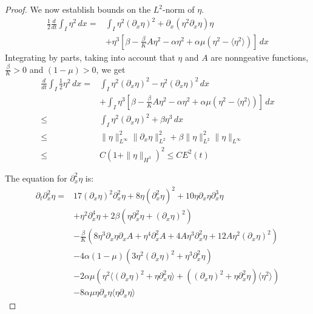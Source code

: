 \documentclass[12pt]{amsart}
\newcommand{\D}{\,d}
\begin{document}
\begin{proof}
We now establish bounds on the $L^2$\nobreakdash-norm of $\eta$.
	\begin{equation*}
        \begin{split}
		\frac{1}{2}\frac{d}{dt} \int_I \eta^2 \D x=&\int_I \eta^2(\partial_x \eta)^2+\partial_x(\eta^2\partial_x\eta)\eta\\
		&+\eta^3\left[\beta-\frac{\beta}{K}A\eta^2-\alpha \eta^2+\alpha\mu(\eta^2-\langle\eta^2\rangle)\right]\D x
        \end{split}
	\end{equation*}
	Integrating by parts, taking into account that $\eta$ and $A$ are nonngeative functions, $\frac{\beta}{K}>0$ and $(1-\mu)>0$, we get
	\begin{align*}
		\frac{d}{dt} \int_I \frac{1}{2}\eta^2 \D x=&\int_I \eta^2(\partial_x \eta)^2-\eta^2(\partial_x\eta)^2
		\D x\\
        &+\int_I \eta^3\left[\beta-\frac{\beta}{K}A\eta^2-\alpha \eta^2+\alpha\mu(\eta^2-\langle \eta^2 \rangle)\right]\D x\\
		\leq&\int_I \eta^2(\partial_x \eta)^2+\beta\eta^3 \D x\\
		\leq& \|\eta\|_{L^\infty}^2\|\partial_x \eta\|_{L^2}^2+\beta\|\eta\|^2_{L^2}\|\eta\|_{L^\infty}\\
		\leq& C(1+\|\eta\|_{H^3})^2	\leq CE^2(t)
	\end{align*}
	
		The equation for $\partial_x^2 \eta$ is:
	\begin{align*}
		\partial_t \partial^2_x\eta=&17(\partial_x \eta)^2\partial_x^2\eta+8\eta(\partial_x^2\eta)^2+10\eta\partial_x\eta\partial_x^3\eta\\
        &+\eta^2\partial_x^4\eta
		+2\beta(\eta\partial^2_x\eta+(\partial_x\eta)^2)\\
		&-\frac{\beta}{K}(8\eta^3\partial_x\eta\partial_xA+\eta^4\partial^2_xA+4A\eta^3\partial^2_x\eta+12A\eta^2(\partial_x\eta)^2)\\
		&-4\alpha(1-\mu)(3\eta^2(\partial_x\eta)^2+\eta^3\partial^2_x\eta)\\
		&-2\alpha\mu(\eta^2\langle(\partial_x\eta)^2+\eta\partial^2_x\eta\rangle+((\partial_x\eta)^2+\eta\partial^2_x\eta)\langle \eta^2 \rangle)\\
		&-8\alpha\mu\eta\partial_x\eta\langle\eta\partial_x\eta\rangle
	\end{align*}
	

\end{proof}
\end{document}
